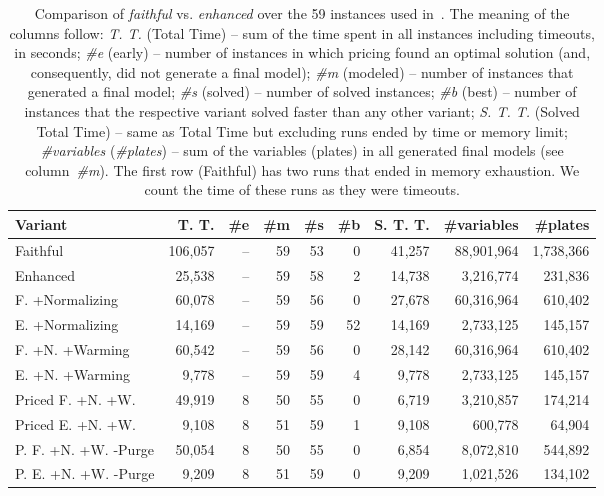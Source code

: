\documentclass[smallextended]{svjour3}       %
\begin{document}
\begin{table}[h]
\caption{Comparison of \emph{faithful} vs. \emph{enhanced} over the 59 instances used in~\cite{dimitri_thesis}.
The meaning of the columns follow:
\emph{T. T.} (Total Time) -- sum of the time spent in all instances including timeouts, in seconds;
\emph{\#e} (early) -- number of instances in which pricing found an optimal solution (and, consequently, did not generate a final model);
\emph{\#m} (modeled) -- number of instances that generated a final model;
\emph{\#s} (solved) -- number of solved instances;
\emph{\#b} (best) -- number of instances that the respective variant solved faster than any other variant;
\emph{S. T. T.} (Solved Total Time) -- same as Total Time but excluding runs ended by time or memory limit;
\emph{\#variables} (\emph{\#plates}) -- sum of the variables (plates) in all generated final models (see column~\emph{\#m}).
The first row (Faithful) has two runs that ended in memory exhaustion.
We count the time of these runs as they were timeouts.
}
\begin{tabular}{lrrrrrrrr}
\hline\hline
Variant & T. T. & \#e & \#m & \#s & \#b & S. T. T. & \#variables & \#plates \\\hline
Faithful & 106,057 & -- & 59 & 53 & 0 & 41,257 & 88,901,964 & 1,738,366 \\
Enhanced & 25,538 & -- & 59 & 58 & 2 & 14,738 & 3,216,774 & 231,836 \\
F. +Normalizing & 60,078 & -- & 59 & 56 & 0 & 27,678 & 60,316,964 & 610,402 \\
E. +Normalizing & 14,169 & -- & 59 & 59 & 52 & 14,169 & 2,733,125 & 145,157 \\
F. +N. +Warming & 60,542 & -- & 59 & 56 & 0 & 28,142 & 60,316,964 & 610,402 \\
E. +N. +Warming & 9,778 & -- & 59 & 59 & 4 & 9,778 & 2,733,125 & 145,157 \\
Priced F. +N. +W. & 49,919 & 8 & 50 & 55 & 0 & 6,719 & 3,210,857 & 174,214 \\
Priced E. +N. +W. & 9,108 & 8 & 51 & 59 & 1 & 9,108 & 600,778 & 64,904 \\
P. F. +N. +W. -Purge & 50,054 & 8 & 50 & 55 & 0 & 6,854 & 8,072,810 & 544,892 \\
P. E. +N. +W. -Purge & 9,209 & 8 & 51 & 59 & 0 & 9,209 & 1,021,526 & 134,102 \\\hline\hline
\end{tabular}
\label{tab:contribution}
\end{table}
\end{document}
